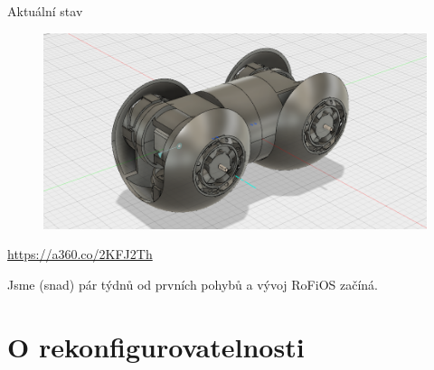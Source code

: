 \documentclass{beamer}
\begin{document}
\begin{frame}{Aktuální stav}
    \begin{figure}
        \centering
        \includegraphics[width=\textwidth]{img/rofi3}
    \end{figure}

    \url{https://a360.co/2KFJ2Th}

    Jsme (snad) pár týdnů od prvních pohybů a vývoj RoFiOS začíná.
\end{frame}

\section{O rekonfigurovatelnosti}
\end{document}
